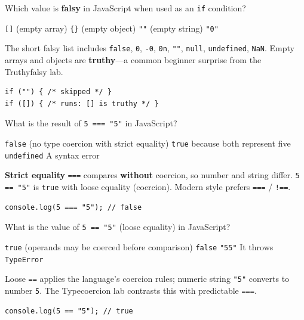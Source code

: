 \question[4]
Which value is \textbf{falsy} in JavaScript when used as an \texttt{if} condition?
\begin{choices}
  \choice \texttt{[]} (empty array)
  \choice \texttt{\{\}} (empty object)
  \CorrectChoice \texttt{""} (empty string)
  \choice \texttt{"0"}
\end{choices}
\begin{solution}
  The short falsy list includes \texttt{false}, \texttt{0}, \texttt{-0}, \texttt{0n}, \texttt{""}, \texttt{null}, \texttt{undefined}, \texttt{NaN}. Empty arrays and objects are \textbf{truthy}---a common beginner surprise from the Truthyfalsy lab.
\begin{lstlisting}[style=js]
if ("") { /* skipped */ }
if ([]) { /* runs: [] is truthy */ }
\end{lstlisting}
\end{solution}

\question[4]
What is the result of \texttt{5 === "5"} in JavaScript?
\begin{choices}
  \CorrectChoice \texttt{false} (no type coercion with strict equality)
  \choice \texttt{true} because both represent five
  \choice \texttt{undefined}
  \choice A syntax error
\end{choices}
\begin{solution}
  \textbf{Strict equality} \texttt{===} compares \textbf{without} coercion, so number and string differ. \texttt{5 == "5"} is \texttt{true} with loose equality (coercion). Modern style prefers \texttt{===} / \texttt{!==}.
\begin{lstlisting}[style=js]
console.log(5 === "5"); // false
\end{lstlisting}
\end{solution}


\newpage
\question[4]
What is the value of \texttt{5 == "5"} (loose equality) in JavaScript?
\begin{choices}
  \CorrectChoice \texttt{true} (operands may be coerced before comparison)
  \choice \texttt{false}
  \choice \texttt{"55"}
  \choice It throws \texttt{TypeError}
\end{choices}
\begin{solution}
  Loose \texttt{==} applies the language's coercion rules; numeric string \texttt{"5"} converts to number \texttt{5}. The Typecoercion lab contrasts this with predictable \texttt{===}.
\begin{lstlisting}[style=js]
console.log(5 == "5"); // true
\end{lstlisting}
\end{solution}

